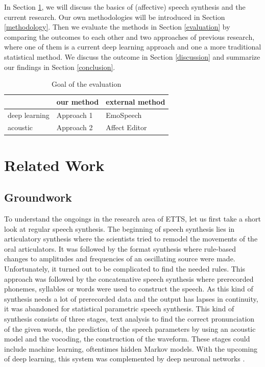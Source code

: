 \documentclass[11pt]{article}
\begin{document}
In Section \ref{related_work}, we will discuss the basics of (affective) speech synthesis and the current research. Our own methodologies will be introduced in Section \ref{methodology}. Then we evaluate the methods in  Section \ref{evaluation} by comparing the outcomes to each other and two approaches of previous research, where one of them is a current deep learning approach and one a more traditional statistical method. We discuss the outcome in Section \ref{discussion} and summarize our findings in Section \ref{conclusion}.

\begin{table}[h]

\vspace{5px}
{
\begin{tabular}{|l|l|l|}
\hline
\rowcolor{gainsboro}&our method&external method\\
\hline
\cellcolor{gainsboro}deep learning&Approach 1&EmoSpeech\\
\hline
\cellcolor{gainsboro}acoustic&Approach 2&Affect Editor\\
\hline

\end{tabular}

}
\caption{Goal of the evaluation}
\end{table}


\section{Related Work}
\label{related_work}
\subsection{Groundwork}
To understand the ongoings in the research area of ETTS, let us first take a short look at regular speech synthesis. The beginning of speech synthesis lies in articulatory synthesis where the scientists tried to remodel the movements of the oral articulators. It was followed by the format synthesis where rule-based changes to amplitudes and frequencies of an oscillating source were made. Unfortunately, it turned out to be complicated to find the needed rules. This approach was followed by the concatenative speech synthesis where prerecorded phonemes, syllables or words were used to construct the speech. As this kind of synthesis needs a lot of prerecorded data and the output has lapses in continuity, it was abandoned for statistical parametric speech synthesis. This kind of synthesis consists of three stages, text analysis to find the correct pronunciation of the given words, the prediction of the speech parameters by using an acoustic model and the vocoding, the construction of the waveform. These stages could include machine learning, oftentimes hidden Markov models. With the upcoming of deep learning, this system was complemented by deep neuronal networks \cite{triantafyllopoulos_overview_2023,shen_natural_2018}.
\end{document}
